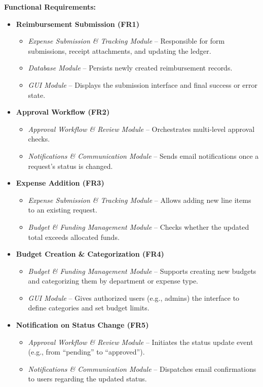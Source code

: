 \documentclass[12pt, titlepage]{article}
\begin{document}
\textbf{Functional Requirements:}
\begin{itemize}
  \item \textbf{Reimbursement Submission (FR1)} 
    \begin{itemize}
      \item \emph{Expense Submission \& Tracking Module} – Responsible for form submissions, receipt attachments, and updating the ledger.
      \item \emph{Database Module} – Persists newly created reimbursement records.
      \item \emph{GUI Module} – Displays the submission interface and final success or error state.
    \end{itemize}

  \item \textbf{Approval Workflow (FR2)}
    \begin{itemize}
      \item \emph{Approval Workflow \& Review Module} – Orchestrates multi-level approval checks.
      \item \emph{Notifications \& Communication Module} – Sends email notifications once a request’s status is changed.
    \end{itemize}

  \item \textbf{Expense Addition (FR3)}
    \begin{itemize}
      \item \emph{Expense Submission \& Tracking Module} – Allows adding new line items to an existing request.
      \item \emph{Budget \& Funding Management Module} – Checks whether the updated total exceeds allocated funds.
    \end{itemize}

  \item \textbf{Budget Creation \& Categorization (FR4)}
    \begin{itemize}
      \item \emph{Budget \& Funding Management Module} – Supports creating new budgets and categorizing them by department or expense type.
      \item \emph{GUI Module} – Gives authorized users (e.g., admins) the interface to define categories and set budget limits.
    \end{itemize}

  \item \textbf{Notification on Status Change (FR5)}
    \begin{itemize}
      \item \emph{Approval Workflow \& Review Module} – Initiates the status update event (e.g., from “pending” to “approved”).
      \item \emph{Notifications \& Communication Module} – Dispatches email confirmations to users regarding the updated status.
    \end{itemize}


\end{itemize}
\end{document}
